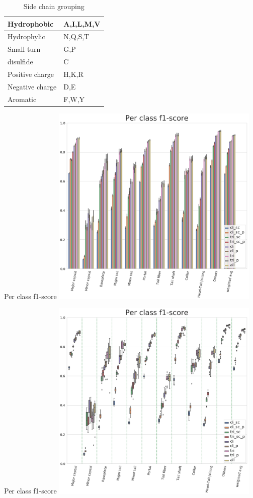 \documentclass{beamer}
\begin{document}
\begin{frame}
\begin{table}[]
\caption{Side chain grouping}
\begin{tabular}{|l|l|}
\hline
Hydrophobic     & A,I,L,M,V \\ \hline
Hydrophylic     & N,Q,S,T   \\ \hline
Small turn      & G,P       \\ \hline
disulfide       & C         \\ \hline
Positive charge & H,K,R     \\ \hline
Negative charge & D,E       \\ \hline
Aromatic        & F,W,Y     \\ \hline
\end{tabular}
\end{table}
\end{frame}



\begin{frame}{Per class f1-score}
\includegraphics[width=0.75\textwidth]{f1_score_master_per_class}
\end{frame}

\begin{frame}{Per class f1-score}
\includegraphics[width=0.75\textwidth]{f1_score_master_per_class_boxplot}
\end{frame}
\end{document}
